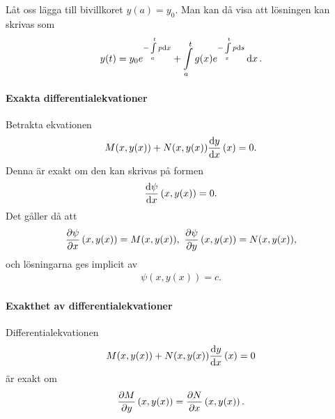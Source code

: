Låt oss lägga till bivillkoret $y(a) = y_0$. Man kan då visa att lösningen kan skrivas som
\begin{align*}
	y(t) = y_0e^{-\int\limits_{a}^{t}p\dd{x}} + \int\limits_{a}^{t}g(x)e^{-\int\limits_{x}^{t}p\dd{s}}\dd{x}.
\end{align*}

\paragraph{Exakta differentialekvationer}
Betrakta ekvationen
\begin{align*}
	M(x, y(x)) + N(x, y(x))\dv{y}{x} \left(x\right) = 0.
\end{align*}
Denna är exakt om den kan skrivas på formen
\begin{align*}
	\dv{\psi}{x} \left(x, y(x)\right) = 0.
\end{align*}
Det gåller då att
\begin{align*}
	\pdv{\psi}{x} \left(x, y(x)\right) = M(x, y(x)),\ \pdv{\psi}{y} \left(x, y(x)\right) = N(x, y(x)),
\end{align*}
och lösningarna ges implicit av
\begin{align*}
	\psi(x, y(x)) = c.
\end{align*}

\paragraph{Exakthet av differentialekvationer}
Differentialekvationen
\begin{align*}
	M(x, y(x)) + N(x, y(x))\dv{y}{x} \left(x\right) = 0
\end{align*}
är exakt om
\begin{align*}
	\pdv{M}{y} \left(x, y(x)\right) = \pdv{N}{x} \left(x, y(x)\right).
\end{align*}
